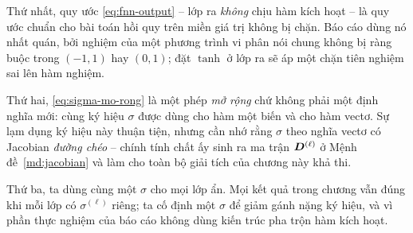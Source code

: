 Thứ nhất, quy ước \eqref{eq:fnn-output} -- lớp ra \emph{không} chịu hàm kích
hoạt -- là quy ước chuẩn cho bài toán hồi quy trên miền giá trị không bị chặn.
Báo cáo dùng nó nhất quán, bởi nghiệm của một phương trình vi phân nói chung
không bị ràng buộc trong $(-1,1)$ hay $(0,1)$; đặt $\tanh$ ở lớp ra sẽ áp một
chặn tiên nghiệm sai lên hàm nghiệm.
 
Thứ hai, \eqref{eq:sigma-mo-rong} là một phép \emph{mở rộng} chứ không phải một
định nghĩa mới: cùng ký hiệu $\sigma$ được dùng cho hàm một biến và cho hàm
vectơ. Sự lạm dụng ký hiệu này thuận tiện, nhưng cần nhớ rằng $\sigma$ theo
nghĩa vectơ có Jacobian \emph{đường chéo} -- chính tính chất ấy sinh ra ma trận
$\bm{D}^{(\ell)}$ ở Mệnh đề~\ref{md:jacobian} và làm cho toàn bộ giải tích của
chương này khả thi.
 
Thứ ba, ta dùng cùng một $\sigma$ cho mọi lớp ẩn. Mọi kết quả trong chương vẫn
đúng khi mỗi lớp có $\sigma^{(\ell)}$ riêng; ta cố định một $\sigma$ để giảm
gánh nặng ký hiệu, và vì phần thực nghiệm của báo cáo không dùng kiến trúc pha
trộn hàm kích hoạt.
 
